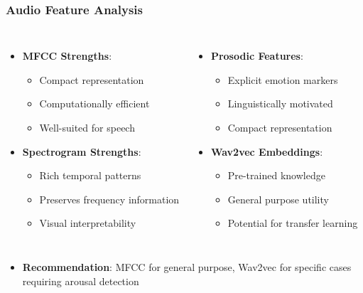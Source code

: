 \begin{frame}
\frametitle{Audio Feature Analysis}
\begin{columns}
\begin{itemize}
    \item \textbf{MFCC Strengths}:
    \begin{itemize}
        \item Compact representation
        \item Computationally efficient
        \item Well-suited for speech
    \end{itemize}
    \item \textbf{Spectrogram Strengths}:
    \begin{itemize}
        \item Rich temporal patterns
        \item Preserves frequency information
        \item Visual interpretability
    \end{itemize}
\end{itemize}

\begin{itemize}
    \item \textbf{Prosodic Features}:
    \begin{itemize}
        \item Explicit emotion markers
        \item Linguistically motivated
        \item Compact representation
    \end{itemize}
    \item \textbf{Wav2vec Embeddings}:
    \begin{itemize}
        \item Pre-trained knowledge
        \item General purpose utility
        \item Potential for transfer learning
    \end{itemize}
\end{itemize}
\end{columns}

\begin{itemize}
    \item \textbf{Recommendation}: MFCC for general purpose, Wav2vec for specific cases requiring arousal detection
\end{itemize}
\end{frame}


